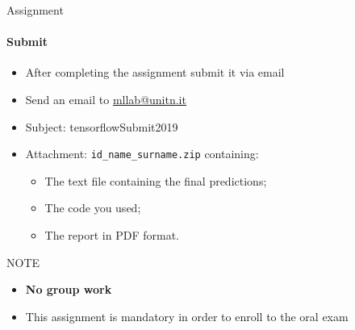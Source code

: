 \documentclass[10pt]{beamer}
\begin{document}
\begin{frame}{Assignment}
\framesubtitle{Submit}

\begin{itemize}
    \item After completing the assignment submit it via email
    \item Send an email to \href{mailto:mllab@unitn.it}{mllab@unitn.it} 
    \item Subject: tensorflowSubmit2019
    \item Attachment: \texttt{id\_name\_surname.zip} containing:
    \begin{itemize}
        \item The text file containing the final predictions;
        \item The code you used;
        \item The report in PDF format.
    \end{itemize}
\end{itemize}
\begin{alertblock}{NOTE}
    \begin{itemize}
	\item \textbf{No group work}
        \item This assignment is mandatory in order to enroll to the oral exam
    \end{itemize}
\end{alertblock}

\end{frame}

\end{document}
